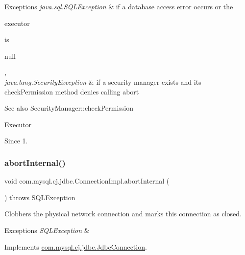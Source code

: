 \begin{DoxyExceptions}{Exceptions}
{\em java.\+sql.\+S\+Q\+L\+Exception} & if a database access error occurs or the
\begin{DoxyCode}
executor 
\end{DoxyCode}
 is
\begin{DoxyCode}
null 
\end{DoxyCode}
 , \\
\hline
{\em java.\+lang.\+Security\+Exception} & if a security manager exists and its {\ttfamily check\+Permission} method denies calling {\ttfamily abort} \\
\hline
\end{DoxyExceptions}
\begin{DoxySeeAlso}{See also}
Security\+Manager\+::check\+Permission 

Executor 
\end{DoxySeeAlso}
\begin{DoxySince}{Since}
1. 
\end{DoxySince}
\mbox{\label{classcom_1_1mysql_1_1cj_1_1jdbc_1_1_connection_impl_a39a1f63273b1ccd8e4baf30f1f6955a9}} 
\subsubsection{\texorpdfstring{abort\+Internal()}{abortInternal()}}
{\footnotesize\ttfamily void com.\+mysql.\+cj.\+jdbc.\+Connection\+Impl.\+abort\+Internal (\begin{DoxyParamCaption}{ }\end{DoxyParamCaption}) throws S\+Q\+L\+Exception}

Clobbers the physical network connection and marks this connection as closed.


\begin{DoxyExceptions}{Exceptions}
{\em S\+Q\+L\+Exception} & \\
\hline
\end{DoxyExceptions}


Implements \mbox{\hyperlink{interfacecom_1_1mysql_1_1cj_1_1jdbc_1_1_jdbc_connection_afc07faaedcdfc3be9fa9bfcf751b673a}{com.\+mysql.\+cj.\+jdbc.\+Jdbc\+Connection}}.

